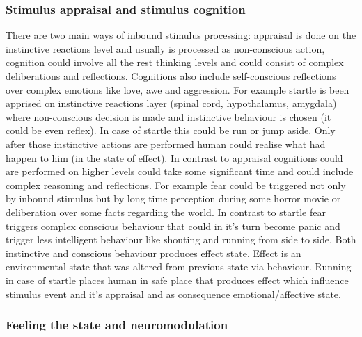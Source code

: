 \subsubsection{Stimulus appraisal and stimulus cognition}

There are two main ways of inbound stimulus processing: appraisal is done on the instinctive reactions level and usually is processed as non-conscious action, cognition could involve all the rest thinking levels and could consist of complex deliberations and reflections.
Cognitions also include self-conscious reflections over complex emotions like love, awe and aggression. For example startle is been apprised on instinctive reactions layer (spinal cord, hypothalamus, amygdala) where non-conscious decision is made and instinctive behaviour is chosen (it could be even reflex). In case of startle this could be run or jump aside. Only after those instinctive actions are performed human could realise what had happen to him (in the state of effect). In contrast to appraisal cognitions could are performed on higher levels could take some significant time and could include complex reasoning and reflections. For example fear could be triggered not only by inbound stimulus but by long time perception during some horror movie or deliberation over some facts regarding the world. In contrast to startle fear triggers complex conscious behaviour that could in it's turn become panic and trigger less intelligent behaviour like shouting and running from side to side. Both instinctive and conscious behaviour produces effect state. Effect is an environmental state that was altered from previous state via behaviour. Running in case of startle places human in safe place that produces effect which influence stimulus event and it's appraisal and as consequence emotional/affective state.

\subsubsection{Feeling the state and neuromodulation}

